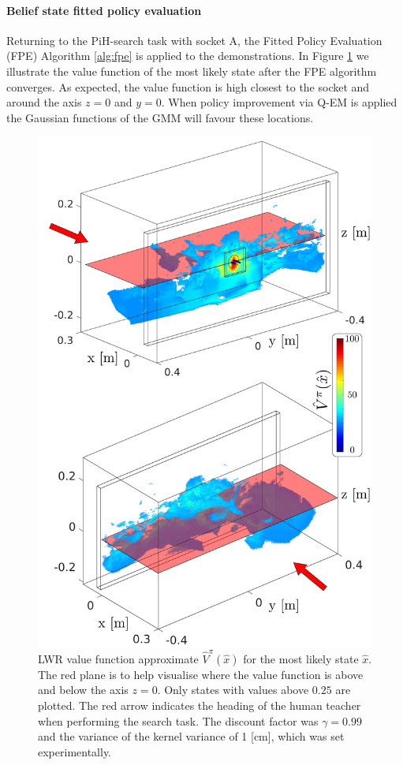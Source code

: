 \paragraph{Belief state fitted policy evaluation}

Returning to the PiH-search task with socket A, the Fitted Policy Evaluation (FPE) Algorithm \ref{alg:fpe} is applied to the 
demonstrations. In Figure \ref{fig:ch4:Figure1}  we illustrate the value function of the most likely state after the FPE algorithm converges. 
As expected, the value function is high closest to the socket and around the axis $z=0$ and $y=0$. 
When policy improvement via Q-EM is applied the Gaussian functions of the GMM will favour these locations. 

\begin{figure}
 \centering
 \includegraphics[width=\textwidth]{./ch4-PiH/Figures/ValueFunction/value_func_final_v2.pdf}
 \caption{LWR value function approximate $\hat{V}^{\pi}(\hat{x})$ for the most likely state $\hat{x}$. 
 The red plane is to help visualise where the value function is above and below the axis $z=0$. Only states with values above
 $0.25$ are plotted.  The red arrow indicates the heading of the human teacher when performing the search task. The discount 
 factor was $\gamma=0.99$ and the variance of the kernel variance of 1 [cm], which was set experimentally.
}
 \label{fig:ch4:Figure1}
\end{figure}

